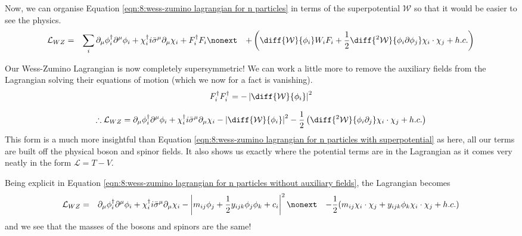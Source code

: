 Now, we can organise Equation \ref{eqn:8:wess-zumino lagrangian for n particles} in terms of the superpotential $\mathcal{W}$ so that it would be easier to see the physics.
\begin{eqnarray}
    \mathcal{L}_{WZ} &=& \sum_{i} \partial_\mu \phi^\dagger_i \partial^\mu \phi_i + \chi_i^\dagger i \Bar{\sigma}^\mu \partial_\mu \chi_i + F_i^\dagger F_i \nonext
    &&+ \left(\diff{\mathcal{W}}{\phi_i} W_i F_i + \frac{1}{2} \diff{^2\mathcal{W}}{\phi_i\partial\phi_j}\chi_i\cdot\chi_j + h.c.\right)
    \label{eqn:8:wess-zumino lagrangian for n particles with superpotential}
\end{eqnarray}

Our Wess-Zumino Lagrangian is now completely supersymmetric! We can work a little more to remove the auxiliary fields from the Lagrangian solving their equations of motion (which we now for a fact is vanishing).
\begin{equation}
    F_i^\dagger F_i^\dagger = -\left\vert\diff{\mathcal{W}}{\phi_i}\right\vert^2
\end{equation}

\begin{equation}
    \therefore \mathcal{L}_{WZ} = \partial_\mu \phi^\dagger_i \partial^\mu \phi_i + \chi_i^\dagger i \Bar{\sigma}^\mu \partial_\mu \chi_i - \left\vert\diff{\mathcal{W}}{\phi_i}\right\vert^2 - \frac{1}{2}\left(\diff{^2\mathcal{W}}{\phi_i \partial_j}\chi_i\cdot\chi_j + h.c.\right)
    \label{eqn:8:wess-zumino lagrangian for n particles without auxiliary fields}
\end{equation}
This form is a much more insightful than Equation \ref{eqn:8:wess-zumino lagrangian for n particles with superpotential} as here, all our terms are built off the physical boson and spinor fields. It also shows us exactly where the potential terms are in the Lagrangian as it comes very neatly in the form $\mathcal{L} = T - V$.

Being explicit in Equation \ref{eqn:8:wess-zumino lagrangian for n particles without auxiliary fields}, the Lagrangian becomes
\begin{eqnarray}
    \mathcal{L}_{WZ} &=& \partial_\mu \phi_i^\dagger \partial^\mu \phi_i + \chi_i^\dagger i \Bar{\sigma}^\mu \partial_\mu \chi_i - \left\vert m_{ij} \phi_j + \frac{1}{2} y_{ijk}\phi_j\phi_k + c_i\right\vert^2 \nonext
    && - \frac{1}{2} (m_{ij} \chi_i\cdot\chi_j + y_{ijk}\phi_k\chi_i\cdot\chi_j + h.c. )
    \label{eqn:8:wess-zumino lagrangian expanded}
\end{eqnarray}
and we see that the masses of the bosons and spinors are the same!

